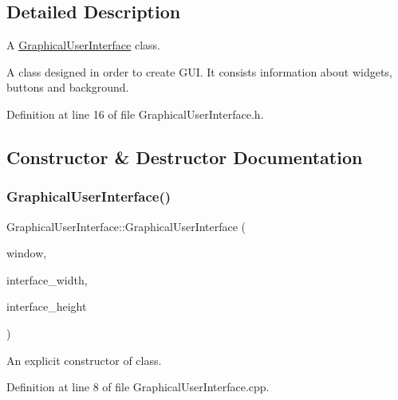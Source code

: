 \subsection{Detailed Description}
A \hyperlink{classGraphicalUserInterface}{Graphical\+User\+Interface} class. 

A class designed in order to create G\+UI. It consists information about widgets, buttons and background. 

Definition at line 16 of file Graphical\+User\+Interface.\+h.



\subsection{Constructor \& Destructor Documentation}
\mbox{\label{classGraphicalUserInterface_a53c95b6d9e7a7b1f04b60d925a8e2e7b}} 
\subsubsection{\texorpdfstring{Graphical\+User\+Interface()}{GraphicalUserInterface()}}
{\footnotesize\ttfamily Graphical\+User\+Interface\+::\+Graphical\+User\+Interface (\begin{DoxyParamCaption}\item[{sf\+::\+Render\+Window \&}]{window,  }\item[{const int}]{interface\+\_\+width,  }\item[{const int}]{interface\+\_\+height }\end{DoxyParamCaption})\hspace{0.3cm}{\ttfamily [explicit]}}



An explicit constructor of class. 



Definition at line 8 of file Graphical\+User\+Interface.\+cpp.



